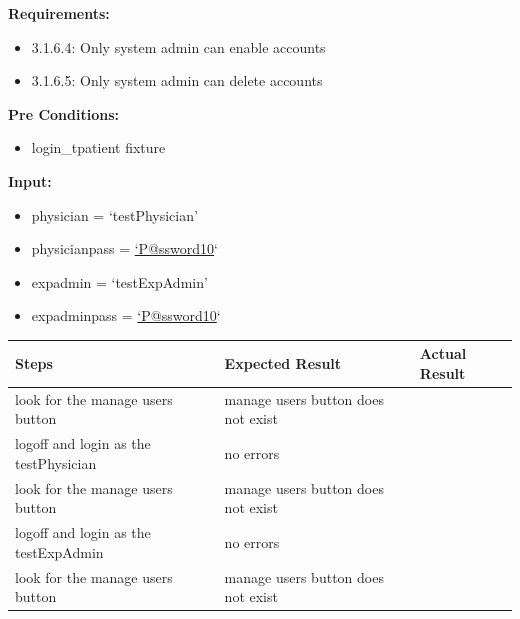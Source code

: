\documentclass[letterpaper,10pt,english]{sphinxmanual}
\begin{document}
\begin{fulllineitems}
\label{STD/test_security:test_security.test_system_admin_user_management}
\textbf{Requirements:}
\begin{itemize}
\item {} 
3.1.6.4: Only system admin can enable accounts

\item {} 
3.1.6.5: Only system admin can delete accounts

\end{itemize}

\textbf{Pre Conditions:}
\begin{itemize}
\item {} 
login\_tpatient fixture

\end{itemize}

\textbf{Input:}
\begin{itemize}
\item {} 
physician = `testPhysician'

\item {} 
physicianpass = \href{mailto:'P@ssword10}{`P@ssword10}`

\item {} 
expadmin = `testExpAdmin'

\item {} 
expadminpass = \href{mailto:'P@ssword10}{`P@ssword10}`

\end{itemize}

\begin{tabulary}{\linewidth}{|L|L|L|}
\hline
\textsf{\relax 
Steps
} & \textsf{\relax 
Expected Result
} & \textsf{\relax 
Actual Result
}\\
\hline
look for the manage users button
 & 
manage users button does not exist
 & \\
\hline
logoff and login as the testPhysician
 & 
no errors
 & \\
\hline
look for the manage users button
 & 
manage users button does not exist
 & \\
\hline
logoff and login as the testExpAdmin
 & 
no errors
 & \\
\hline
look for the manage users button
 & 
manage users button does not exist
 & \\
\hline\end{tabulary}


\end{fulllineitems}
\end{document}
